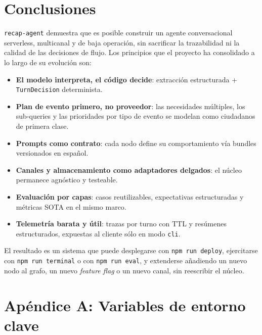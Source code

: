 \documentclass[11pt,a4paper]{article}
\begin{document}
\section{Conclusiones}

\texttt{recap-agent} demuestra que es posible construir un agente
conversacional serverless, multicanal y de baja operación, sin
sacrificar la trazabilidad ni la calidad de las decisiones de flujo.
Los principios que el proyecto ha consolidado a lo largo de su
evolución son:

\begin{itemize}[leftmargin=*,itemsep=1pt]
  \item \textbf{El modelo interpreta, el código decide}: extracción
        estructurada + \texttt{TurnDecision} determinista.
  \item \textbf{Plan de evento primero, no proveedor}: las
        necesidades múltiples, los sub-queries y las prioridades por
        tipo de evento se modelan como ciudadanos de primera clase.
  \item \textbf{Prompts como contrato}: cada nodo define su
        comportamiento vía bundles versionados en español.
  \item \textbf{Canales y almacenamiento como adaptadores delgados}:
        el núcleo permanece agnóstico y testeable.
  \item \textbf{Evaluación por capas}: casos reutilizables,
        expectativas estructuradas y métricas SOTA en el mismo marco.
  \item \textbf{Telemetría barata y útil}: trazas por turno con TTL
        y resúmenes estructurados, expuestas al cliente sólo en modo
        \texttt{cli}.
\end{itemize}

El resultado es un sistema que puede desplegarse con
\texttt{npm run deploy}, ejercitarse con \texttt{npm run terminal} o
con \texttt{npm run eval}, y extenderse añadiendo un nuevo nodo al
grafo, un nuevo \emph{feature flag} o un nuevo canal, sin reescribir
el núcleo.

\appendix
\section{Apéndice A: Variables de entorno clave}
\end{document}
